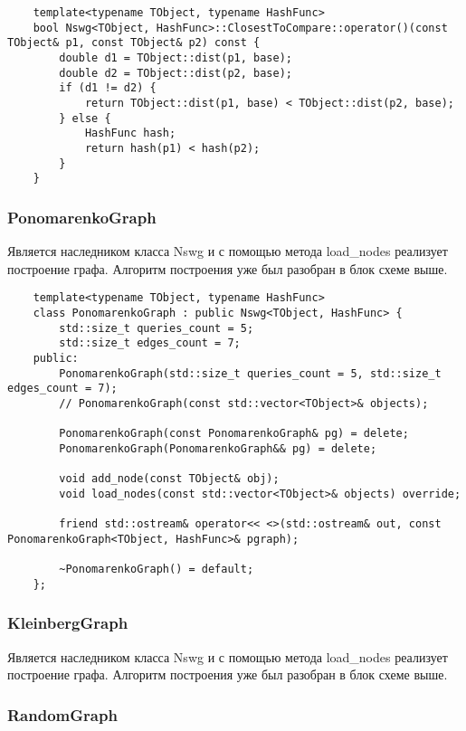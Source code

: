 \begin{verbatim}
    template<typename TObject, typename HashFunc>
    bool Nswg<TObject, HashFunc>::ClosestToCompare::operator()(const TObject& p1, const TObject& p2) const {
        double d1 = TObject::dist(p1, base);
        double d2 = TObject::dist(p2, base);
        if (d1 != d2) {
            return TObject::dist(p1, base) < TObject::dist(p2, base);
        } else {
            HashFunc hash;
            return hash(p1) < hash(p2);
        }
    }
\end{verbatim}

\subsubsection{PonomarenkoGraph}

Является наследником класса Nswg и с помощью метода load\_nodes реализует построение графа.
Алгоритм построения уже был разобран в блок схеме выше.

\begin{verbatim}
    template<typename TObject, typename HashFunc>
    class PonomarenkoGraph : public Nswg<TObject, HashFunc> {
        std::size_t queries_count = 5;
        std::size_t edges_count = 7;
    public:
        PonomarenkoGraph(std::size_t queries_count = 5, std::size_t edges_count = 7);
        // PonomarenkoGraph(const std::vector<TObject>& objects);

        PonomarenkoGraph(const PonomarenkoGraph& pg) = delete;
        PonomarenkoGraph(PonomarenkoGraph&& pg) = delete;

        void add_node(const TObject& obj);
        void load_nodes(const std::vector<TObject>& objects) override;

        friend std::ostream& operator<< <>(std::ostream& out, const PonomarenkoGraph<TObject, HashFunc>& pgraph);

        ~PonomarenkoGraph() = default;
    };
\end{verbatim}


\subsubsection{KleinbergGraph}

Является наследником класса Nswg и с помощью метода load\_nodes реализует построение графа.
Алгоритм построения уже был разобран в блок схеме выше.

\subsubsection{RandomGraph}

